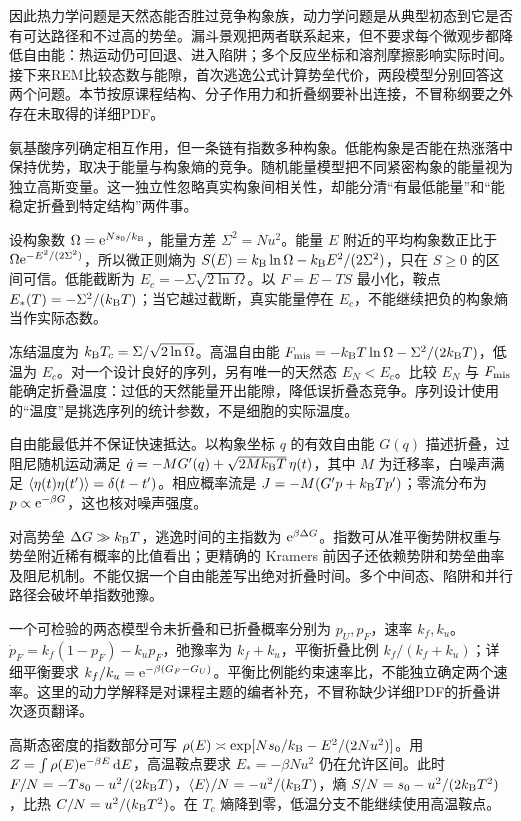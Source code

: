 因此热力学问题是天然态能否胜过竞争构象族，动力学问题是从典型初态到它是否有可达路径和不过高的势垒。漏斗景观把两者联系起来，但不要求每个微观步都降低自由能：热运动仍可回退、进入陷阱；多个反应坐标和溶剂摩擦影响实际时间。接下来REM比较态数与能隙，首次逃逸公式计算势垒代价，两段模型分别回答这两个问题。本节按原课程结构、分子作用力和折叠纲要补出连接，不冒称纲要之外存在未取得的详细PDF。

氨基酸序列确定相互作用，但一条链有指数多种构象。低能构象是否能在热涨落中保持优势，取决于能量与构象熵的竞争。随机能量模型把不同紧密构象的能量视为独立高斯变量。这一独立性忽略真实构象间相关性，却能分清“有最低能量”和“能稳定折叠到特定结构”两件事。

设构象数 $\Omega=\mathrm e^{Ns_0/k_{\mathrm B}}$，能量方差 $\Sigma^2=Nu^2$。能量 $E$ 附近的平均构象数正比于 $\Omega\mathrm e^{-E^2/(2\Sigma^2)}$，所以微正则熵为 $S(E)=k_{\mathrm B}\ln\Omega-k_{\mathrm B} E^2/(2\Sigma^2)$，只在 $S\ge0$ 的区间可信。低能截断为 $E_c=-\Sigma\sqrt{2\ln\Omega}$。以 $F=E-TS$ 最小化，鞍点 $E_*(T)=-\Sigma^2/(k_{\mathrm B} T)$；当它越过截断，真实能量停在 $E_c$，不能继续把负的构象熵当作实际态数。

冻结温度为 $k_{\mathrm B} T_c=\Sigma/\sqrt{2\ln\Omega}$。高温自由能 $F_{\rm mis}=-k_{\mathrm B} T\ln\Omega-\Sigma^2/(2k_{\mathrm B} T)$，低温为 $E_c$。对一个设计良好的序列，另有唯一的天然态 $E_N<E_c$。比较 $E_N$ 与 $F_{\rm mis}$ 能确定折叠温度：过低的天然能量开出能隙，降低误折叠态竞争。序列设计使用的“温度”是挑选序列的统计参数，不是细胞的实际温度。

自由能最低并不保证快速抵达。以构象坐标 $q$ 的有效自由能 $G(q)$ 描述折叠，过阻尼随机运动满足 $\dot q=-M G'(q)+\sqrt{2Mk_{\mathrm B} T}\,\eta(t)$，其中 $M$ 为迁移率，白噪声满足 $\langle \eta(t)\eta(t')\rangle=\delta(t-t')$。相应概率流是 $J=-M(G'p+k_{\mathrm B} T p')$；零流分布为 $p\propto\mathrm e^{-\beta G}$，这也核对噪声强度。

对高势垒 $\Delta G\gg k_{\mathrm B} T$，逃逸时间的主指数为 $\mathrm e^{\beta\Delta G}$。指数可从准平衡势阱权重与势垒附近稀有概率的比值看出；更精确的 Kramers 前因子还依赖势阱和势垒曲率及阻尼机制。不能仅据一个自由能差写出绝对折叠时间。多个中间态、陷阱和并行路径会破坏单指数弛豫。

一个可检验的两态模型令未折叠和已折叠概率分别为 $p_U,p_F$，速率 $k_f,k_u$。$\dot p_F=k_f(1-p_F)-k_up_F$，弛豫率为 $k_f+k_u$，平衡折叠比例 $k_f/(k_f+k_u)$；详细平衡要求 $k_f/k_u=\mathrm e^{-\beta(G_F-G_U)}$。平衡比例能约束速率比，不能独立确定两个速率。这里的动力学解释是对课程主题的编者补充，不冒称缺少详细PDF的折叠讲次逐页翻译。

高斯态密度的指数部分可写 $\rho(E)\asymp\exp[Ns_0/k_{\mathrm B}-E^2/(2Nu^2)]$。用 $Z=\int\rho(E)\mathrm e^{-\beta E}\,\mathrm d E$，高温鞍点要求 $E_*=-\beta Nu^2$ 仍在允许区间。此时 $F/N=-Ts_0-u^2/(2k_{\mathrm B} T)$，$\langle E\rangle/N=-u^2/(k_{\mathrm B} T)$，熵 $S/N=s_0-u^2/(2k_{\mathrm B} T^2)$，比热 $C/N=u^2/(k_{\mathrm B} T^2)$。在 $T_c$ 熵降到零，低温分支不能继续使用高温鞍点。

